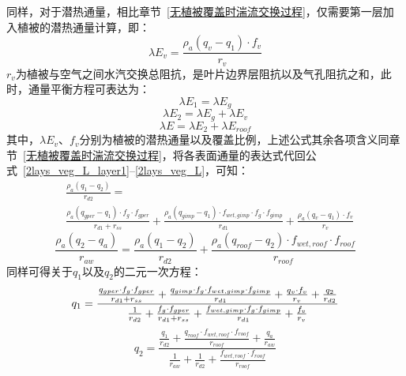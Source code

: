 同样，对于潜热通量，相比章节~\ref{无植被覆盖时湍流交换过程}，仅需要第一层加入植被的潜热通量计算，即：
\begin{equation}
    \lambda E_{v} = \frac{\rho _a \left( q_{v}-q_{1}\right) \cdot f_v}{r_{v}}
\end{equation}
$r_v$为植被与空气之间水汽交换总阻抗，是叶片边界层阻抗以及气孔阻抗之和，此时，通量平衡方程可表达为：
\begin{equation}\label{2lays_veg_L_layer1}
    \lambda E_{1} = \lambda E_{g}
\end{equation}
%
\begin{equation}
    \lambda E_{2} = \lambda E_{g} + \lambda E_{v}
\end{equation}
%
\begin{equation}\label{2lays_veg_L}
    \lambda E = \lambda E_{2} + \lambda E_{roof}
\end{equation}
其中，$\lambda E_{v}$、$f_v$分别为植被的潜热通量以及覆盖比例，上述公式其余各项含义同章节~\ref{无植被覆盖时湍流交换过程}，将各表面通量的表达式代回公式~\eqref{2lays_veg_L_layer1}--\eqref{2lays_veg_L}，可知：
\begin{equation}
   \begin{split}
    & \frac{\rho _a \left( q_{1}-q_{2}\right)}{r_{d2}} = \\
    & \frac{\rho _a \left( q_{gper}-q_{1}\right) \cdot f_{g} \cdot f_{gper}}{r_{d1}+r_{ss}} + \frac{\rho _a \left( q_{gimp}-q_{1} \right) \cdot f_{wet,gimp} \cdot f_{g} \cdot f_{gimp}}{r_{d1}} + \frac{\rho _a \left( q_{v}-q_{1}\right) \cdot f_v}{r_{v}}
   \end{split} 
\end{equation}
%
\begin{equation}
    \frac{\rho _a \left( q_{2} - q_a\right)}{r_{aw}} = \frac{\rho _a \left( q_{1} - q_{2}\right)}{r_{d2}} + \frac{\rho _a \left( q_{roof}-q_{2}\right) \cdot f_{wet,roof} \cdot f_{roof}}{r_{roof}}
\end{equation}
同样可得关于$q_{1}$以及$q_{2}$的二元一次方程：
\begin{equation}
    q_{1} = \\
    \frac{\frac{q_{gper} \cdot f_{g} \cdot f_{gper}}{r_{d1} + r_{ss}} + \frac{q_{gimp} \cdot f_{g} \cdot f_{wet,gimp} \cdot f_{gimp}}{r_{d1}} + \frac{q_{v} \cdot f_v}{r_{v}} + \frac{q_{2}}{r_{d2}}}{\frac{1}{r_{d2}} + \frac{f_{g} \cdot f_{gper}}{r_{d1} + r_{ss}} + \frac{f_{wet,gimp} \cdot f_{g} \cdot f_{gimp}}{r_{d1}}+\frac{f_v}{r_{v}}}
\end{equation}
%
\begin{equation}\label{equ_2lays_veg_Q_lay2}
    q_{2} = \frac{\frac{q_{1}}{r_{d2}} + \frac{q_{roof} \cdot f_{wet,roof} \cdot f_{roof}}{r_{roof}} + \frac{q_a}{r_{aw}}}{\frac{1}{r_{aw}} + \frac{1}{r_{d2}} + \frac{f_{wet,roof} \cdot f_{roof}}{r_{roof}}}
\end{equation}
